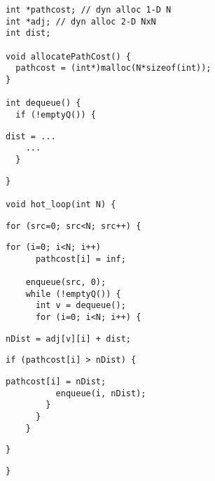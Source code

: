 \begin{lstlisting}[morekeywords={pathcost,dist}, aboveskip=0pt, belowskip=0pt, firstnumber=1]
int *pathcost; // dyn alloc 1-D N
int *adj; // dyn alloc 2-D NxN
int dist;

void allocatePathCost() {
  pathcost = (int*)malloc(N*sizeof(int));
}

int dequeue() {
  if (!emptyQ()) {
\end{lstlisting}

\begin{lstlisting}[morekeywords={pathcost,dist}, aboveskip=0pt, belowskip=0pt,
firstnumber=13, name=dij_checks]
    dist = ...
    ...
  }
\end{lstlisting}

\begin{lstlisting}[morekeywords={pathcost,dist}, aboveskip=0pt, belowskip=0pt,
firstnumber=18, name=dij_checks]
}

void hot_loop(int N) {
\end{lstlisting}
\begin{lstlisting}[morekeywords={pathcost}, aboveskip=0pt, belowskip=0pt,
firstnumber=25]
  for (src=0; src<N; src++) {
\end{lstlisting}
\begin{lstlisting}[morekeywords={pathcost,dist}, aboveskip=0pt, belowskip=0pt,
firstnumber=28]
    for (i=0; i<N; i++)
      pathcost[i] = inf;

    enqueue(src, 0);
    while (!emptyQ()) {
      int v = dequeue();
      for (i=0; i<N; i++) {
\end{lstlisting}
\begin{lstlisting}[morekeywords={pathcost,dist}, aboveskip=0pt,
belowskip=0pt, firstnumber=37,name=dij_checks]
        nDist = adj[v][i] + dist;
\end{lstlisting}
\begin{lstlisting}[morekeywords={pathcost}, aboveskip=0pt, belowskip=0pt,
firstnumber=40]
        if (pathcost[i] > nDist) {
\end{lstlisting}
\begin{lstlisting}[morekeywords={pathcost}, aboveskip=0pt, belowskip=0pt,
firstnumber=43]
          pathcost[i] = nDist;
          enqueue(i, nDist);
        }
      }
    }
\end{lstlisting}
\begin{lstlisting}[morekeywords={pathcost}, aboveskip=0pt,
belowskip=0pt, firstnumber=52]
  }
\end{lstlisting}
\begin{lstlisting}[morekeywords={pathcost}, aboveskip=0pt,
belowskip=0pt, firstnumber=57]
}
\end{lstlisting}
